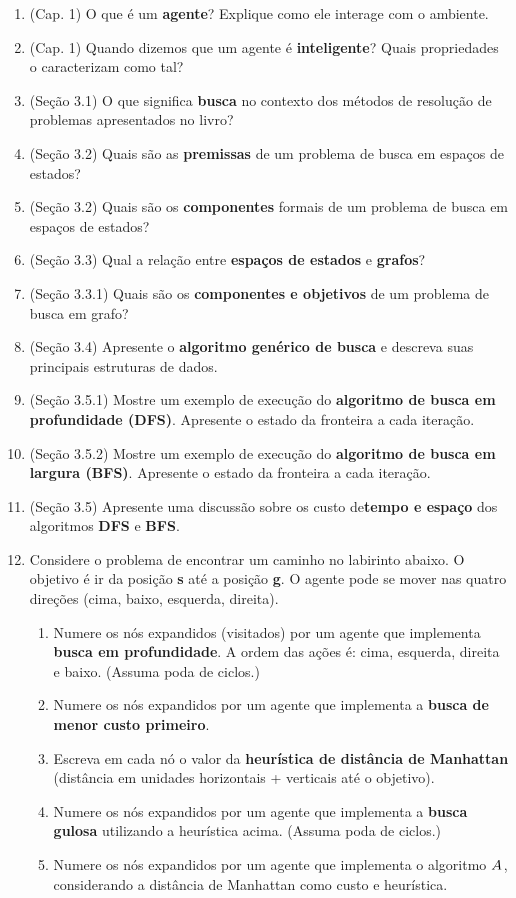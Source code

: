 \documentclass[9pt,a4paper]{extarticle}
\begin{document}
\begin{enumerate}

  \item (Cap. 1) O que é um \textbf{agente}? Explique como ele interage com o ambiente.
  \item (Cap. 1) Quando dizemos que um agente é \textbf{inteligente}? Quais propriedades o caracterizam como tal?
  
  \item (Seção 3.1) O que significa \textbf{busca} no contexto dos métodos de resolução de problemas apresentados no livro?
  \item (Seção 3.2) Quais são as \textbf{premissas} de um problema de busca em espaços de estados?
  \item (Seção 3.2) Quais são os \textbf{componentes} formais de um problema de busca em espaços de estados?
  \item (Seção 3.3) Qual a relação entre \textbf{espaços de estados} e \textbf{grafos}?
  \item (Seção 3.3.1) Quais são os \textbf{componentes e objetivos} de um problema de busca em grafo?
  \item (Seção 3.4) Apresente o \textbf{algoritmo genérico de busca} e descreva suas principais estruturas de dados.
  \item (Seção 3.5.1) Mostre um exemplo de execução do \textbf{algoritmo de busca em profundidade (DFS)}. Apresente o estado da fronteira a cada iteração.
  \item (Seção 3.5.2) Mostre um exemplo de execução do \textbf{algoritmo de busca em largura (BFS)}. Apresente o estado da fronteira a cada iteração.
  \item (Seção 3.5) Apresente uma discussão sobre os custo de\textbf{tempo e espaço} dos algoritmos \textbf{DFS} e \textbf{BFS}. 

  \item Considere o problema de encontrar um caminho no labirinto abaixo. O objetivo é ir da posição \textbf{s} até a posição \textbf{g}. O agente pode se mover nas quatro direções (cima, baixo, esquerda, direita). 

  \begin{enumerate}[label*=\alph*)]
    \item Numere os nós expandidos (visitados) por um agente que implementa \textbf{busca em profundidade}. A ordem das ações é: cima, esquerda, direita e baixo. (Assuma poda de ciclos.)
    \item Numere os nós expandidos por um agente que implementa a \textbf{busca de menor custo primeiro}.
    \item Escreva em cada nó o valor da \textbf{heurística de distância de Manhattan} (distância em unidades horizontais + verticais até o objetivo).
    \item Numere os nós expandidos por um agente que implementa a \textbf{busca gulosa} utilizando a heurística acima. (Assuma poda de ciclos.)
    \item Numere os nós expandidos por um agente que implementa o algoritmo \textbf{$A^{\*}$}, considerando a distância de Manhattan como custo e heurística.


\end{enumerate}
\end{enumerate}
\end{document}
